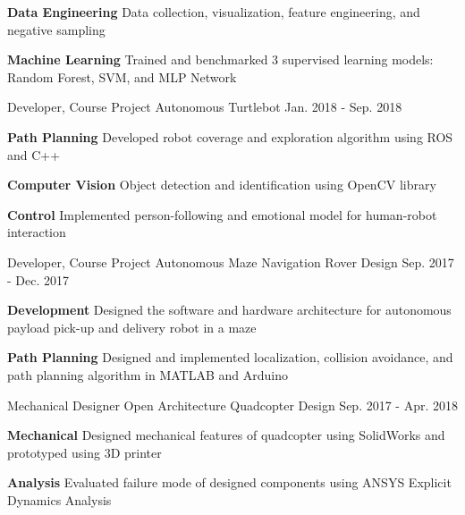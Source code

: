\begin{cventries}
{\begin{cvitems}
			\item {\textbf{Data Engineering} Data collection, visualization, feature engineering, and negative sampling}
			\item {\textbf{Machine Learning} Trained and benchmarked 3 supervised learning models: Random Forest, SVM, and MLP Network}
		\end{cvitems}
	}
	\cventry
	{Developer, Course Project}
	{Autonomous Turtlebot}
	{Jan. 2018 - Sep. 2018}
	{}
	{
		\begin{cvitems}
			\item {\textbf{Path Planning} Developed robot coverage and exploration algorithm using ROS and C++}
			\item {\textbf{Computer Vision} Object detection and identification using OpenCV library}
			\item {\textbf{Control} Implemented person-following and emotional model for human-robot interaction}
		\end{cvitems}
	}
	\cventry
	{Developer, Course Project}
	{Autonomous Maze Navigation Rover Design}
	{Sep. 2017 - Dec. 2017}
	{}
	{
		\begin{cvitems}
			\item { \textbf{Development} Designed the software and hardware architecture for autonomous payload pick-up and delivery robot in a maze}
			\item { \textbf{Path Planning} Designed and implemented localization, collision avoidance, and path planning algorithm in MATLAB and Arduino}
		\end{cvitems}
	}
	\cventry
	{Mechanical Designer}
	{Open Architecture Quadcopter Design}
	{Sep. 2017 - Apr. 2018}
	{}
	{
		\begin{cvitems}
			\item {\textbf{Mechanical} Designed mechanical features of quadcopter using SolidWorks and prototyped using 3D printer}
			\item {\textbf{Analysis} Evaluated failure mode of designed components using ANSYS Explicit Dynamics Analysis}
		\end{cvitems}
	}

\end{cventries}
